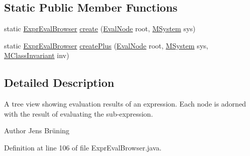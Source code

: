 \subsection*{Static Public Member Functions}
\begin{DoxyCompactItemize}
\item 
static \hyperlink{classorg_1_1tzi_1_1use_1_1gui_1_1views_1_1evalbrowser_1_1_expr_eval_browser}{Expr\-Eval\-Browser} \hyperlink{classorg_1_1tzi_1_1use_1_1gui_1_1views_1_1evalbrowser_1_1_expr_eval_browser_a7c8a3d6ce16e681fbde92ae8a23bf34b}{create} (\hyperlink{classorg_1_1tzi_1_1use_1_1uml_1_1ocl_1_1expr_1_1_eval_node}{Eval\-Node} root, \hyperlink{classorg_1_1tzi_1_1use_1_1uml_1_1sys_1_1_m_system}{M\-System} sys)
\item 
static \hyperlink{classorg_1_1tzi_1_1use_1_1gui_1_1views_1_1evalbrowser_1_1_expr_eval_browser}{Expr\-Eval\-Browser} \hyperlink{classorg_1_1tzi_1_1use_1_1gui_1_1views_1_1evalbrowser_1_1_expr_eval_browser_aa684dc63355701c1ffed3d4b62b8dc4b}{create\-Plus} (\hyperlink{classorg_1_1tzi_1_1use_1_1uml_1_1ocl_1_1expr_1_1_eval_node}{Eval\-Node} root, \hyperlink{classorg_1_1tzi_1_1use_1_1uml_1_1sys_1_1_m_system}{M\-System} sys, \hyperlink{classorg_1_1tzi_1_1use_1_1uml_1_1mm_1_1_m_class_invariant}{M\-Class\-Invariant} inv)
\end{DoxyCompactItemize}


\subsection{Detailed Description}
A tree view showing evaluation results of an expression. Each node is adorned with the result of evaluating the sub-\/expression.

\begin{DoxyAuthor}{Author}
Jens Brüning 
\end{DoxyAuthor}


Definition at line 106 of file Expr\-Eval\-Browser.\-java.




